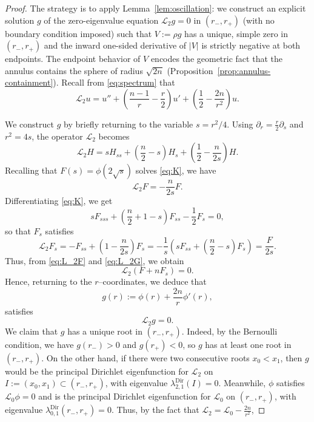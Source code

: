 \documentclass[11pt]{article}
\numberwithin{equation}{section}
\theoremstyle{definition}
\begin{document}
\begin{proof}
The strategy is to apply Lemma~\ref{lem:oscillation}: we construct an explicit solution $g$ of the zero-eigenvalue equation $\mathscr{L}_2 g=0$ in $(r_-,r_+)$ (with no boundary condition imposed) such that $V:=\rho g$ has a unique, simple zero in $(r_-,r_+)$ and the inward one-sided derivative of $|V|$ is strictly negative at both endpoints. The endpoint behavior of $V$ encodes the geometric fact that the annulus contains the sphere of radius $\sqrt{2n}$ (Proposition~\ref{prop:annulus-containment}). Recall from \eqref{eq:spectrum} that
\begin{equation}
    \mathscr{L}_{2}u=u''+\left(\frac{n-1}{r}-\frac{r}{2}\right)u'+ \left( \frac12 - \frac{2n}{r^2} \right)u.
\end{equation}

We construct $g$ by briefly returning to the variable $s=r^2/4$. 
Using $\partial_r =\frac{r}{2}\partial_s$ and $r^2=4s$, the operator $\mathscr{L}_2$ becomes
\begin{equation}
    \mathcal{L}_2H=sH_{ss}+\left(\frac{n}{2}-s\right)H_s+\left(\frac12 -\frac{n}{2s}\right)H.
\end{equation}
Recalling that $F(s) =\phi(2\sqrt{s})$ solves \eqref{eq:K}, we have
\begin{equation} \label{eq:L_2F}
    \mathcal{L}_2F = -\frac{n}{2s}F.
\end{equation}
Differentiating \eqref{eq:K}, we get
\begin{equation}
    sF_{sss}+\left( \frac{n}{2}+1-s \right)F_{ss}-\frac12F_s=0,
\end{equation}
so that $F_s$ satisfies
\begin{equation} \label{eq:L_2G}
    \mathcal{L}_2 F_s=-F_{ss}+ \left(1 -\frac{n}{2s}\right)F_s=-\frac{1}{s}\left(sF_{ss}+\left(\frac{n}{2}-s\right)F_s\right)=\frac{F}{2s}.
\end{equation}
Thus, from \eqref{eq:L_2F} and \eqref{eq:L_2G}, we obtain
\begin{equation}
    \mathcal{L}_2(F+nF_s)=0.
\end{equation}
Hence, returning to the $r$--coordinates, we deduce that
\begin{equation}\label{eq:L2-g-definition}
g(r):=\phi(r)+\frac{2n}{r}\phi'(r),
\end{equation}
satisfies
\begin{equation}
        \mathscr{L}_2g=0.
\end{equation}
 We claim that $g$ has a unique root in $(r_-,r_+)$. Indeed, by the Bernoulli condition, we have $g(r_-)>0$ and $g(r_+)<0$, so $g$ has at least one root in $(r_-,r_+)$. On the other hand, if there were two consecutive roots $x_0<x_1$, then $g$ would be the principal Dirichlet eigenfunction for $\mathscr{L}_2$ on $I:=(x_0,x_1) \subset (r_-,r_+)$, with eigenvalue $\lambda^{\operatorname{Dir}}_{2,1}(I)=0$. Meanwhile, $\phi$ satisfies $\mathscr{L}_0\phi=0$ and is the principal Dirichlet eigenfunction for $\mathscr{L}_0$ on $(r_-,r_+)$, with eigenvalue $\lambda_{0,1}^{\operatorname{Dir}}(r_-,r_+)=0$. Thus, by the fact that $\mathscr{L}_2=\mathscr{L}_0-\frac{2n}{r^2}$,

\end{proof}
\end{document}
